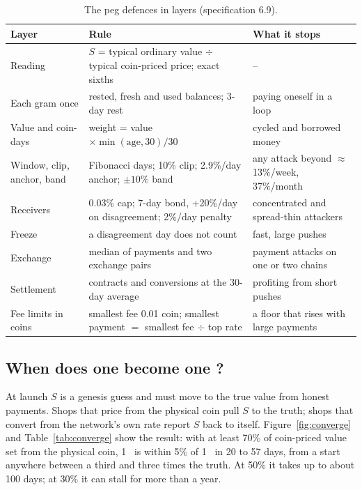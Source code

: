 \begin{table}[htbp]
\centering\small
\begin{tabularx}{\textwidth}{l Y Y}
\toprule
\textbf{Layer} & \textbf{Rule} & \textbf{What it stops}\\
\midrule
Reading & $S$ = typical ordinary value $\div$ typical coin-priced price; exact sixths & --\\
Each gram once & rested, fresh and used balances; 3-day rest & paying oneself in a loop\\
Value and coin-days & weight = value $\times\min(\text{age},30)/30$ & cycled and borrowed money\\
Window, clip, anchor, band & Fibonacci days; 10\% clip; 2.9\%/day anchor; $\pm10\%$ band & any attack beyond $\approx$13\%/week, 37\%/month\\
Receivers & 0.03\% cap; 7-day bond, +20\%/day on disagreement; 2\%/day penalty & concentrated and spread-thin attackers\\
Freeze & a disagreement day does not count & fast, large pushes\\
Exchange & median of payments and two exchange pairs & payment attacks on one or two chains\\
Settlement & contracts and conversions at the 30-day average & profiting from short pushes\\
Fee limits in coins & smallest fee 0.01 coin; smallest payment $=$ smallest fee $\div$ top rate & a floor that rises with large payments\\
\bottomrule
\end{tabularx}
\caption{The peg defences in layers (specification 6.9).}
\label{tab:layers}
\end{table}

\subsection{When does one \JEN{} become one \SEN?}\label{sec:converge}
At launch $S$ is a genesis guess and must move to the true value from honest payments. Shops that price from the physical coin pull $S$ to the truth; shops that convert from the network's own rate report $S$ back to itself. Figure~\ref{fig:converge} and Table~\ref{tab:converge} show the result: with at least 70\% of coin-priced value set from the physical coin, 1~\JEN{} is within 5\% of 1~\SEN{} in 20 to 57 days, from a start anywhere between a third and three times the truth. At 50\% it takes up to about 100 days; at 30\% it can stall for more than a year.

